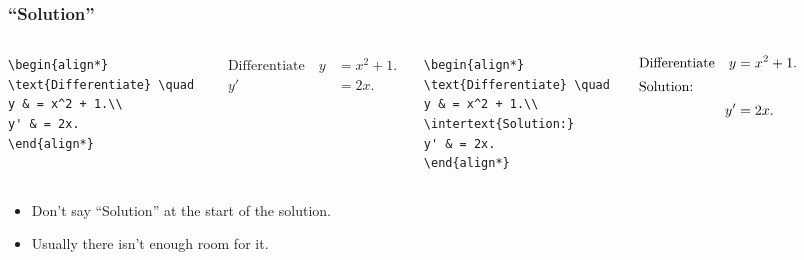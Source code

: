 \begin{frame}[fragile]
\frametitle{``Solution''}
\begin{columns}[t]
\begin{verbatim}
\begin{align*}
\text{Differentiate} \quad 
y & = x^2 + 1.\\
y' & = 2x.
\end{align*}

\end{verbatim}
\begin{example}[GOOD]
\abovedisplayskip=0pt
\belowdisplayskip=0pt
\begin{align*}
\text{Differentiate} \quad y & = x^2 + 1.\\
y' & = 2x.
\end{align*}
\end{example}
\begin{verbatim}
\begin{align*}
\text{Differentiate} \quad 
y & = x^2 + 1.\\
\intertext{Solution:}
y' & = 2x.
\end{align*}
\end{verbatim}
\begin{example}[BAD]
\abovedisplayskip=0pt
\belowdisplayskip=0pt
\begin{align*}
\text{Differentiate} \quad y & = x^2 + 1.\\
\intertext{Solution:}
y' & = 2x.
\end{align*}
\end{example}
\end{columns}
\begin{itemize}
\item  Don't say ``Solution'' at the start of the solution.
\item  Usually there isn't enough room for it.
\end{itemize}
\end{frame}
